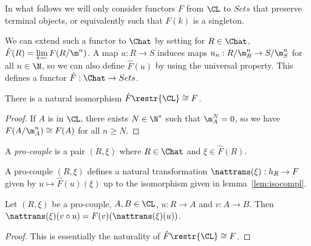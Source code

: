 In what follows we will only consider functors $F$ from $\CL$ to $Sets$
that preserve terminal objects,
or equivalently such that $F(k)$ is a singleton.

\begin{definition}
  \label{def:completion}
  \leanok
  We can extend such a functor to $\Chat$ by setting for $R \in \Chat$,
  $\hat{F}(R) = \varprojlim F(R / \m^n)$. A map $u : R \to S$ induces maps
  $u_n : R / \m_R^n \to S / \m_S^n$ for all $n \in \N$, so we can also define
  $\hat{F}(u)$ by using the universal property.
  This defines a functor $\hat{F} : \Chat \to Sets$.
\end{definition}

\begin{lemma}
  \leanok
  \label{lem:isocompl}
  There is a natural isomorphism $\hat{F}\restr{\CL} \cong F$.
\end{lemma}

\begin{proof}
  \leanok
  If $A$ is in $\CL$, there exists $N \in \N^*$ such that $\m_A^N=0$, so we
  have $F(A/\m_A^n) \cong F(A)$ for all $n \ge N$.
\end{proof}

\begin{definition}
  \label{def:procouple}
  \leanok
  A \emph{pro-couple} is a pair $(R, \xi)$ where $R \in \Chat$ and $\xi \in \hat{F} (R)$.
\end{definition}

\begin{definition}
  \leanok
  \label{def:nattrans_of}
  A pro-couple $(R, \xi)$ defines a natural transformation
  $\nattrans(\xi) : h_R \to F$ given by
  $u \mapsto \hat{F} (u) (\xi)$ up to the isomorphism given in
  lemma~\ref{lem:isocompl}.
\end{definition}

\begin{lemma}
  \label{lem:nattrans_of_comp_artinhom}
  \leanok
  Let $(R, \xi)$ be a pro-couple, $A, B \in \CL$, $u : R \to A$ and $v : A \to B$.
  Then $\nattrans(\xi) (v \circ u) = F(v)(\nattrans(\xi) (u))$.
\end{lemma}

\begin{proof}
  \leanok
  This is essentially the naturality of $\hat{F}\restr{\CL} \cong F$.
\end{proof}

